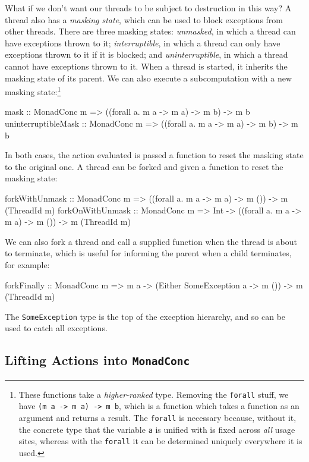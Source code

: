 What if we don't want our threads to be subject to destruction in this
way? A thread also has a \emph{masking state}, which can be used to
block exceptions from other threads. There are three masking states:
\emph{unmasked}, in which a thread can have exceptions thrown to it;
\emph{interruptible}, in which a thread can only have exceptions
thrown to it if it is blocked; and \emph{uninterruptible}, in which a
thread cannot have exceptions thrown to it. When a thread is started,
it inherits the masking state of its parent. We can also execute a
subcomputation with a new masking state:\footnote{These functions take
  a \emph{higher-ranked} type. Removing the \texttt{forall} stuff, we
  have \texttt{(m a -> m a) -> m b}, which is a function which takes a
  function as an argument and returns a result. The \texttt{forall} is
  necessary because, without it, the concrete type that the variable
  \texttt{a} is unified with is fixed across \emph{all} usage sites,
  whereas with the \texttt{forall} it can be determined uniquely
  everywhere it is used.}

\begin{haskellcode}
mask :: MonadConc m => ((forall a. m a -> m a) -> m b) -> m b
uninterruptibleMask :: MonadConc m => ((forall a. m a -> m a) -> m b) -> m b
\end{haskellcode}

In both cases, the action evaluated is passed a function to reset the
masking state to the original one. A thread can be forked and given a
function to reset the masking state:

\begin{haskellcode}
forkWithUnmask :: MonadConc m => ((forall a. m a -> m a) -> m ())
  -> m (ThreadId m)
forkOnWithUnmask :: MonadConc m => Int -> ((forall a. m a -> m a) -> m ())
  -> m (ThreadId m)
\end{haskellcode}

We can also fork a thread and call a supplied function when the thread
is about to terminate, which is useful for informing the parent when a
child terminates, for example:

\begin{haskellcode}
forkFinally :: MonadConc m => m a -> (Either SomeException a -> m ())
  -> m (ThreadId m)
\end{haskellcode}

The \verb|SomeException| type is the top of the exception hierarchy,
and so can be used to catch all exceptions.

\subsection{Lifting Actions into \texttt{MonadConc}}
\label{sec:abstraction-typeclass-lifting}

